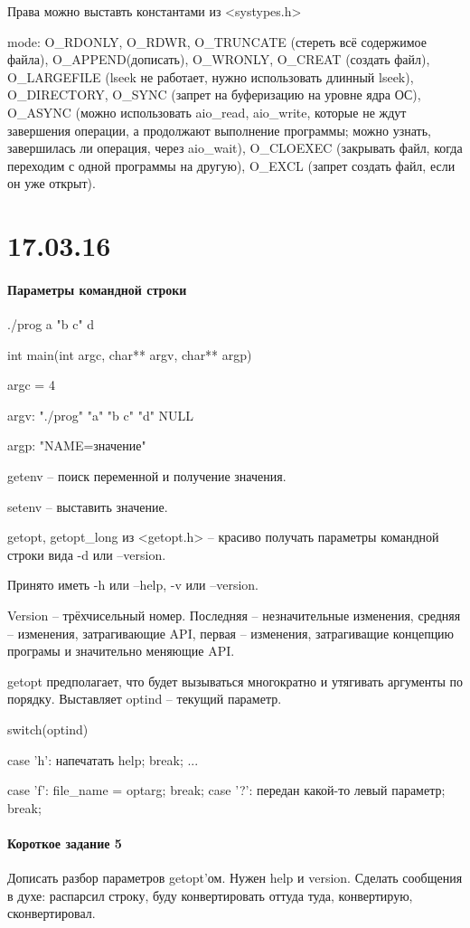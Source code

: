 \documentclass[a4paper,10pt]{article}
\begin{document}
\begin{enumerate}
Права можно выставть константами из <systypes.h>

mode: O\_RDONLY, O\_RDWR, O\_TRUNCATE (стереть всё содержимое файла), O\_APPEND(дописать), O\_WRONLY, O\_CREAT (создать файл), O\_LARGEFILE (lseek не работает, нужно использовать длинный lseek), O\_DIRECTORY, O\_SYNC (запрет на буферизацию на уровне ядра ОС), O\_ASYNC (можно использовать aio\_read, aio\_write, которые не ждут завершения операции, а продолжают выполнение программы; можно узнать, завершилась ли операция, через aio\_wait), O\_CLOEXEC (закрывать файл, когда переходим с одной программы на другую), O\_EXCL (запрет создать файл, если он уже открыт).

\end{enumerate}

\section{17.03.16}
\paragraph{Параметры командной строки}
./prog a "b c" d

int main(int argc, char** argv, char** argp)

argc = 4

argv: "./prog" "a" "b c" "d" NULL

argp: "NAME=значение"

getenv -- поиск переменной и получение значения.

setenv -- выставить значение.

getopt, getopt\_long из <getopt.h> -- красиво получать параметры командной строки вида -d или --version.

Принято иметь -h или --help, -v или --version.

Version -- трёхчисельный номер. Последняя -- незначительные изменения, средняя -- изменения, затрагивающие API, первая -- изменения, затрагиващие концепцию програмы и значительно меняющие API.

getopt предполагает, что будет вызываться многократно и утягивать аргументы по порядку. Выставляет optind -- текущий параметр.

switch(optind)
{
case 'h':
напечатать help;
break;
...

case 'f':
file\_name = optarg;
break;
case '?':
передан какой-то левый параметр;
break;
}
\paragraph{Короткое задание 5}
Дописать разбор параметров getopt'ом. Нужен help и version. Сделать сообщения в духе: распарсил строку, буду конвертировать оттуда туда, конвертирую, сконвертировал.
\end{document}
